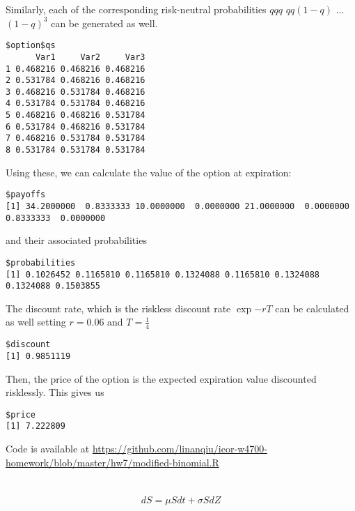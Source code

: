 \documentclass[11pt]{scrartcl}
\begin{document}
Similarly, each of the corresponding risk-neutral probabilities $qqq$ $qq(1-q)$ ... $(1-q)^3$ can be generated as well.

\begin{lstlisting}
$option$qs
      Var1     Var2     Var3
1 0.468216 0.468216 0.468216
2 0.531784 0.468216 0.468216
3 0.468216 0.531784 0.468216
4 0.531784 0.531784 0.468216
5 0.468216 0.468216 0.531784
6 0.531784 0.468216 0.531784
7 0.468216 0.531784 0.531784
8 0.531784 0.531784 0.531784
\end{lstlisting}

Using these, we can calculate the value of the option at expiration:

\begin{lstlisting}
$payoffs
[1] 34.2000000  0.8333333 10.0000000  0.0000000 21.0000000  0.0000000  0.8333333  0.0000000
\end{lstlisting}

and their associated probabilities

\begin{lstlisting}
$probabilities
[1] 0.1026452 0.1165810 0.1165810 0.1324088 0.1165810 0.1324088 0.1324088 0.1503855
\end{lstlisting}

The discount rate, which is the riskless discount rate $\exp{-rT}$ can be calculated as well setting $r=0.06$ and $T=\frac{1}{4}$

\begin{lstlisting}
$discount
[1] 0.9851119
\end{lstlisting}

Then, the price of the option is the expected expiration value discounted risklessly. This gives us

\begin{lstlisting}
$price
[1] 7.222809
\end{lstlisting}

Code is available at \url{https://github.com/linanqiu/ieor-w4700-homework/blob/master/hw7/modified-binomial.R}

\section{}

\subsection{}

\[dS = \mu S dt + \sigma S dZ\]
\end{document}
